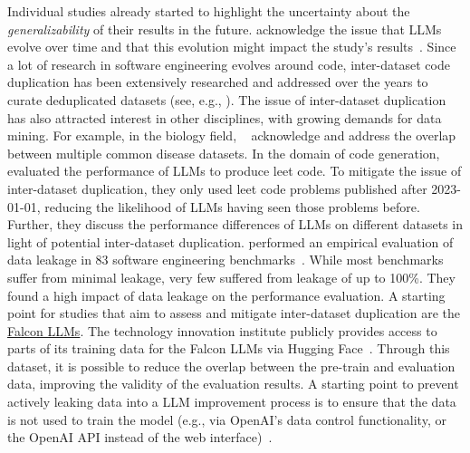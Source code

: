 Individual studies already started to highlight the uncertainty about the \emph{generalizability} of their results in the future. \citeauthor{DBLP:conf/msr/JesseADM23} acknowledge the issue that LLMs evolve over time and that this evolution might impact the study's results~\cite{DBLP:conf/msr/JesseADM23}.
Since a lot of research in software engineering evolves around code, inter-dataset code duplication has been extensively researched and addressed over the years to curate deduplicated datasets (see, e.g., \cite{DBLP:journals/pacmpl/LopesMMSYZSV17, DBLP:conf/oopsla/Allamanis19, DBLP:journals/ese/KarmakarAR23, DBLP:journals/tse/LopezCSSV25}).
The issue of inter-dataset duplication has also attracted interest in other disciplines, with growing demands for data mining.
For example, in the biology field, \citeauthor{DBLP:journals/biodb/LakiotakiVTGT18}~\cite{DBLP:journals/biodb/LakiotakiVTGT18} acknowledge and address the overlap between multiple common disease datasets. 
In the domain of code generation, \citeauthor{DBLP:conf/ease/CoignionQR24}~\cite{DBLP:conf/ease/CoignionQR24} evaluated the performance of LLMs to produce leet code.
To mitigate the issue of inter-dataset duplication, they only used leet code problems published after 2023-01-01, reducing the likelihood of LLMs having seen those problems before. Further, they discuss the performance differences of LLMs on different datasets in light of potential inter-dataset duplication.
\citeauthor{zhou2025lessleakbenchinvestigationdataleakage} performed an empirical evaluation of data leakage in 83 software engineering benchmarks~\cite{zhou2025lessleakbenchinvestigationdataleakage}.
While most benchmarks suffer from minimal leakage, very few suffered from leakage of up to 100\%. They found a high impact of data leakage on the performance evaluation.
A starting point for studies that aim to assess and mitigate inter-dataset duplication are the \href{https://huggingface.co/datasets/tiiuae/falcon-refinedweb}{Falcon LLMs}.
The technology innovation institute publicly provides access to parts of its training data for the Falcon LLMs via Hugging Face~\cite{technology_innovation_institute_2023}.
Through this dataset, it is possible to reduce the overlap between the pre-train and evaluation data, improving the validity of the evaluation results.
A starting point to prevent actively leaking data into a LLM improvement process is to ensure that the data is not used to train the model (e.g., via OpenAI's data control functionality, or the OpenAI API instead of the web interface)~\cite{DBLP:conf/eacl/BalloccuSLD24}.

